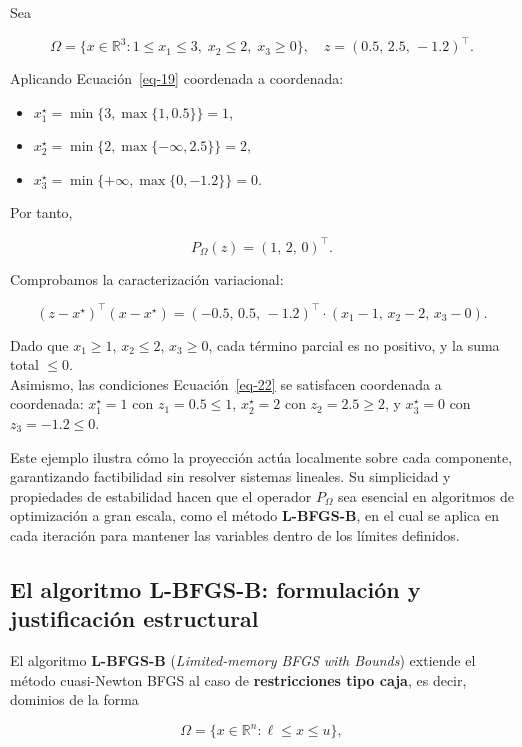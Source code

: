 \documentclass[
  spanish,
  us-letterpaper,
]{scrreprt}
\providecommand{\tightlist}{%
  \setlength{\itemsep}{0pt}\setlength{\parskip}{0pt}}
\numberwithin{equation}{section}
\begin{document}
Sea

\[
\Omega = \{x \in \mathbb{R}^3 : 1 \le x_1 \le 3,\; x_2 \le 2,\; x_3 \ge 0\},
\quad z = (0.5,\, 2.5,\, -1.2)^\top.
\]

Aplicando Ecuación~\ref{eq-19} coordenada a coordenada:

\begin{itemize}
\tightlist
\item
  \(x_1^\star = \min\{3, \max\{1, 0.5\}\} = 1\),
\item
  \(x_2^\star = \min\{2, \max\{-\infty, 2.5\}\} = 2\),
\item
  \(x_3^\star = \min\{+\infty, \max\{0, -1.2\}\} = 0\).
\end{itemize}

Por tanto,

\[
P_\Omega(z) = (1,\, 2,\, 0)^\top.
\]

Comprobamos la caracterización variacional:

\[
(z - x^\star)^\top (x - x^\star)
= (-0.5,\, 0.5,\, -1.2)^\top \cdot (x_1-1,\, x_2-2,\, x_3-0).
\]

Dado que \(x_1 \ge 1\), \(x_2 \le 2\), \(x_3 \ge 0\), cada término
parcial es no positivo, y la suma total \(\le 0\).\\
Asimismo, las condiciones Ecuación~\ref{eq-22} se satisfacen coordenada
a coordenada: \(x_1^\star=1\) con \(z_1=0.5\le1\), \(x_2^\star=2\) con
\(z_2=2.5\ge2\), y \(x_3^\star=0\) con \(z_3=-1.2\le0\).

Este ejemplo ilustra cómo la proyección actúa localmente sobre cada
componente, garantizando factibilidad sin resolver sistemas lineales. Su
simplicidad y propiedades de estabilidad hacen que el operador
\(P_\Omega\) sea esencial en algoritmos de optimización a gran escala,
como el método \textbf{L-BFGS-B}, en el cual se aplica en cada iteración
para mantener las variables dentro de los límites definidos.

\subsection{El algoritmo L-BFGS-B: formulación y justificación
estructural}\label{el-algoritmo-l-bfgs-b-formulaciuxf3n-y-justificaciuxf3n-estructural}

El algoritmo \textbf{L-BFGS-B} (\emph{Limited-memory BFGS with Bounds})
extiende el método cuasi-Newton BFGS al caso de \textbf{restricciones
tipo caja}, es decir, dominios de la forma

\[
\Omega = \{x \in \mathbb{R}^n : \ell \le x \le u\},
\]
\end{document}
